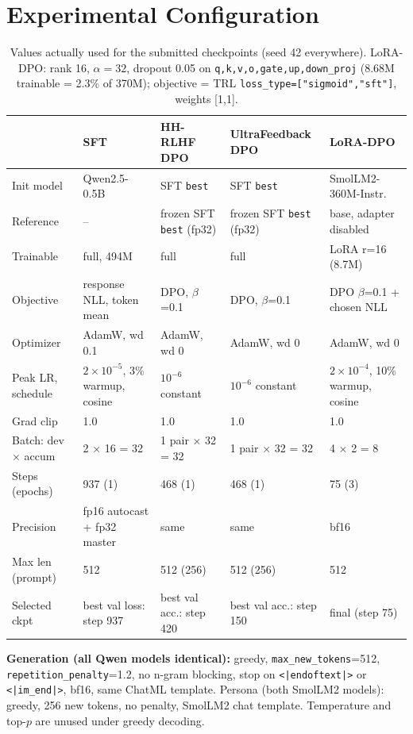 \documentclass[10pt]{article}
\begin{document}
\section{Experimental Configuration}
\begin{table}[H]\centering\small
\caption{Values actually used for the submitted checkpoints (seed 42 everywhere). LoRA-DPO: rank 16, $\alpha=32$, dropout 0.05 on \texttt{q,k,v,o,gate,up,down\_proj} (8.68M trainable = 2.3\% of 370M); objective = TRL \texttt{loss\_type=["sigmoid","sft"]}, weights [1,1].}
\label{tab:config}
\footnotesize\setlength{\tabcolsep}{3pt}
\begin{tabular}{lllll}
\toprule
 & \textbf{SFT} & \textbf{HH-RLHF DPO} & \textbf{UltraFeedback DPO} & \textbf{LoRA-DPO} \\
\midrule
Init model & Qwen2.5-0.5B & SFT \texttt{best} & SFT \texttt{best} & SmolLM2-360M-Instr. \\
Reference & -- & frozen SFT \texttt{best} (fp32) & frozen SFT \texttt{best} (fp32) & base, adapter disabled \\
Trainable & full, 494M & full & full & LoRA r=16 (8.7M) \\
Objective & response NLL, token mean & DPO, $\beta$=0.1 & DPO, $\beta$=0.1 & DPO $\beta$=0.1 + chosen NLL \\
Optimizer & AdamW, wd 0.1 & AdamW, wd 0 & AdamW, wd 0 & AdamW, wd 0 \\
Peak LR, schedule & $2\!\times\!10^{-5}$, 3\% warmup, cosine & $10^{-6}$ constant & $10^{-6}$ constant & $2\!\times\!10^{-4}$, 10\% warmup, cosine \\
Grad clip & 1.0 & 1.0 & 1.0 & 1.0 \\
Batch: dev $\times$ accum & 2 $\times$ 16 = 32 & 1 pair $\times$ 32 = 32 & 1 pair $\times$ 32 = 32 & 4 $\times$ 2 = 8 \\
Steps (epochs) & 937 (1) & 468 (1) & 468 (1) & 75 (3) \\
Precision & fp16 autocast + fp32 master & same & same & bf16 \\
Max len (prompt) & 512 & 512 (256) & 512 (256) & 512 \\
Selected ckpt & best val loss: step 937 & best val acc.: step 420 & best val acc.: step 150 & final (step 75) \\
\bottomrule
\end{tabular}
\end{table}
\textbf{Generation (all Qwen models identical):} greedy, \texttt{max\_new\_tokens}=512, \texttt{repetition\_penalty}=1.2, no n-gram blocking, stop on \texttt{<|endoftext|>} or \texttt{<|im\_end|>}, bf16, same ChatML template. Persona (both SmolLM2 models): greedy, 256 new tokens, no penalty, SmolLM2 chat template. Temperature and top-$p$ are unused under greedy decoding.
\end{document}
